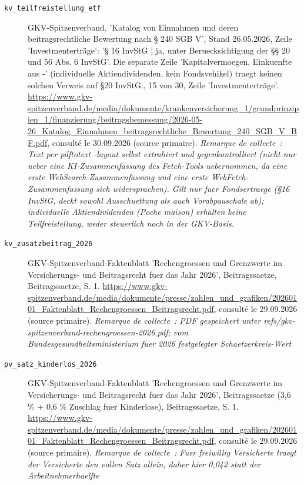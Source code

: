 \begin{description}
\item[\texttt{kv\_teilfreistellung\_etf}] \label{src:kv_teilfreistellung_etf} GKV-Spitzenverband, 'Katalog von Einnahmen und deren beitragsrechtliche Bewertung nach § 240 SGB V', Stand 26.05.2026, Zeile 'Investmenterträge': '§ 16 InvStG | ja, unter Beruecksichtigung der §§ 20 und 56 Abs. 6 InvStG'. Die separate Zeile 'Kapitalvermoegen, Einkuenfte aus -' (individuelle Aktiendividenden, kein Fondsvehikel) traegt keinen solchen Verweis auf §20 InvStG., 15 von 30, Zeile 'Investmenterträge'. \url{https://www.gkv-spitzenverband.de/media/dokumente/krankenversicherung_1/grundprinzipien_1/finanzierung/beitragsbemessung/2026-05-26_Katalog_Einnahmen_beitragsrechtliche_Bewertung_240_SGB_V_BF.pdf}, consulté le 30.09.2026 (source primaire). \textit{Remarque de collecte~: Text per pdftotext -layout selbst extrahiert und gegenkontrolliert (nicht nur ueber eine KI-Zusammenfassung des Fetch-Tools uebernommen, da eine erste WebSearch-Zusammenfassung und eine erste WebFetch-Zusammenfassung sich widersprachen). Gilt nur fuer Fondsertraege (§16 InvStG, deckt sowohl Ausschuettung als auch Vorabpauschale ab); individuelle Aktiendividenden (Poche maison) erhalten keine Teilfreistellung, weder steuerlich noch in der GKV-Basis.}
\item[\texttt{kv\_zusatzbeitrag\_2026}] \label{src:kv_zusatzbeitrag_2026} GKV-Spitzenverband-Faktenblatt 'Rechengroessen und Grenzwerte im Versicherungs- und Beitragsrecht fuer das Jahr 2026', Beitragssaetze, Beitragssaetze, S. 1. \url{https://www.gkv-spitzenverband.de/media/dokumente/presse/zahlen_und_grafiken/20260101_Faktenblatt_Rechengroessen_Beitragsrecht.pdf}, consulté le 29.09.2026 (source primaire). \textit{Remarque de collecte~: PDF gespeichert unter refs/gkv-spitzenverband-rechengroessen-2026.pdf; vom Bundesgesundheitsministerium fuer 2026 festgelegter Schaetzerkreis-Wert}
\item[\texttt{pv\_satz\_kinderlos\_2026}] \label{src:pv_satz_kinderlos_2026} GKV-Spitzenverband-Faktenblatt 'Rechengroessen und Grenzwerte im Versicherungs- und Beitragsrecht fuer das Jahr 2026', Beitragssaetze (3,6 \% + 0,6 \% Zuschlag fuer Kinderlose), Beitragssaetze, S. 1. \url{https://www.gkv-spitzenverband.de/media/dokumente/presse/zahlen_und_grafiken/20260101_Faktenblatt_Rechengroessen_Beitragsrecht.pdf}, consulté le 29.09.2026 (source primaire). \textit{Remarque de collecte~: Fuer freiwillig Versicherte traegt der Versicherte den vollen Satz allein, daher hier 0,042 statt der Arbeitnehmerhaelfte}

\end{description}
